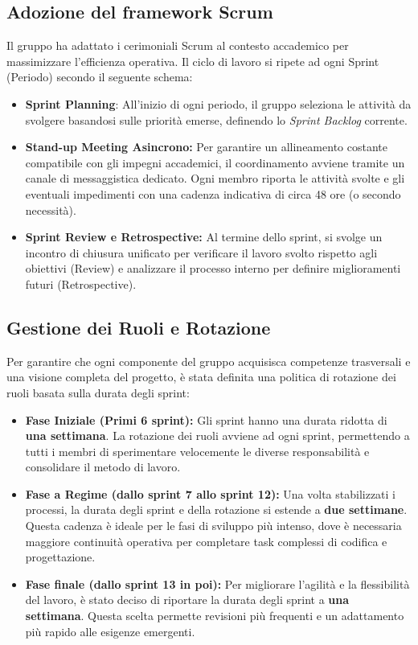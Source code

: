 \documentclass[a4paper, 11pt, oneside]{scrartcl} %
\begin{document}
\subsection{Adozione del framework Scrum}
Il gruppo ha adattato i cerimoniali Scrum al contesto accademico per massimizzare l'efficienza operativa. Il ciclo di lavoro si ripete ad ogni Sprint (Periodo) secondo il seguente schema:
\begin{itemize}
    \item \textbf{Sprint Planning}{\scriptsize{}}: All'inizio di ogni periodo, il gruppo seleziona le attività da svolgere basandosi sulle priorità emerse, definendo lo \textit{Sprint Backlog}{\scriptsize{}} corrente.
    \item \textbf{Stand-up Meeting Asincrono:} Per garantire un allineamento costante compatibile con gli impegni accademici, il coordinamento avviene tramite un canale di messaggistica dedicato. Ogni membro riporta le attività svolte e gli eventuali impedimenti con una cadenza indicativa di circa 48 ore (o secondo necessità).
    \item \textbf{Sprint Review{\scriptsize{}} e Retrospective{\scriptsize{}}:} Al termine dello sprint, si svolge un incontro di chiusura unificato per verificare il lavoro svolto rispetto agli obiettivi (Review) e analizzare il processo interno per definire miglioramenti futuri (Retrospective).
\end{itemize}

\subsection{Gestione dei Ruoli e Rotazione}
Per garantire che ogni componente del gruppo acquisisca competenze trasversali e una visione completa del progetto, è stata definita una politica di rotazione dei ruoli basata sulla durata degli sprint:
\begin{itemize}
    \item \textbf{Fase Iniziale (Primi 6 sprint):} Gli sprint hanno una durata ridotta di \textbf{una settimana}. La rotazione dei ruoli avviene ad ogni sprint, permettendo a tutti i membri di sperimentare velocemente le diverse responsabilità e consolidare il metodo di lavoro.
    \item \textbf{Fase a Regime (dallo sprint 7 allo sprint 12):} Una volta stabilizzati i processi, la durata degli sprint e della rotazione si estende a \textbf{due settimane}. Questa cadenza è ideale per le fasi di sviluppo più intenso, dove è necessaria maggiore continuità operativa per completare task complessi di codifica e progettazione.
    \item \textbf{Fase finale (dallo sprint 13 in poi):} Per migliorare l'agilità e la flessibilità del lavoro, è stato deciso di riportare la durata degli sprint a \textbf{una settimana}. Questa scelta permette revisioni più frequenti e un adattamento più rapido alle esigenze emergenti.
\end{itemize}
\end{document}
